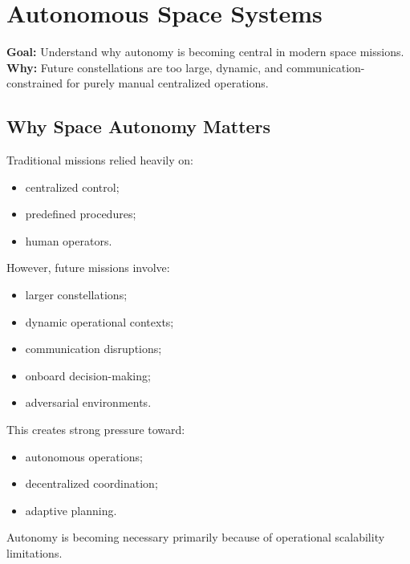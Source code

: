 \documentclass[10pt,a4paper,twocolumn]{article}
\newcommand{\lesson}[3]{
\section{#1}
\noindent
\textbf{Goal:} #2 \newline
\textbf{Why:} #3
\vspace{0.1em}
}
\begin{document}


\lesson
{Autonomous Space Systems}
{Understand why autonomy is becoming central in modern space missions.}
{Future constellations are too large, dynamic, and communication-constrained for purely manual centralized operations.}


\subsection{Why Space Autonomy Matters}

Traditional missions relied heavily on:
\begin{itemize}
    \item centralized control;
    \item predefined procedures;
    \item human operators.
\end{itemize}

However, future missions involve:
\begin{itemize}
    \item larger constellations;
    \item dynamic operational contexts;
    \item communication disruptions;
    \item onboard decision-making;
    \item adversarial environments.
\end{itemize}

This creates strong pressure toward:
\begin{itemize}
    \item autonomous operations;
    \item decentralized coordination;
    \item adaptive planning.
\end{itemize}

\begin{keybox}
    Autonomy is becoming necessary primarily because of operational scalability limitations.
\end{keybox}

\end{document}
